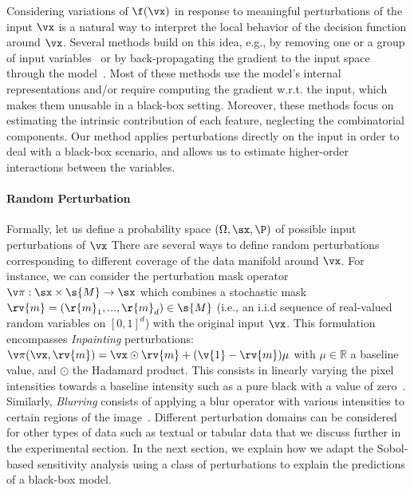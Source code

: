 Considering variations of $\f(\vx)$ in response to meaningful perturbations of the input $\vx$ is a natural way to interpret the local behavior of the decision function around $\vx$. Several methods build on this idea, e.g., by removing one or a group of input variables~\cite{zeiler2014visualizing, ribeiro2016lime, fong2017perturbation, petsiuk2018rise, fong2019extremal} or by back-propagating the gradient to the input space through the model~\cite{simonyan2014deep, sundararajan2017axiomatic, smilkov2017smoothgrad, Selvaraju_2019}. Most of these methods use the model's internal representations and/or require computing the gradient w.r.t. the input, which makes them unusable in a black-box setting. Moreover, these methods focus on estimating the intrinsic contribution of each feature, neglecting the combinatorial components. Our method applies perturbations directly on the input in order to deal with a black-box scenario, and allows us to estimate higher-order interactions between the variables.

\paragraph{Random Perturbation}
\label{sobol:sec:perturbation_masks}

Formally, let us define a probability space $(\Omega,\sx,\P)$ of possible input perturbations of $\vx$
There are several ways to define random perturbations corresponding to different coverage of the data manifold around $\vx$. For instance, we can consider the perturbation mask operator $\perturbation: \sx \times \s{M} \to \sx$ which combines a stochastic mask $\rv{m} = (\r{m}_1, ..., \r{m}_d) \in \s{M}$ (i.e., an i.i.d sequence of real-valued random variables on $[0, 1]^d$) with the original input $\vx$. This formulation encompasses \textit{Inpainting} perturbations: $\perturbation(\vx, \rv{m}) = \vx \odot \rv{m} + (\v{1} - \rv{m}) \mu$ with $\mu \in \mathbb{R}$ a baseline value, and $\odot$ the Hadamard product. This consists in linearly varying the pixel intensities towards a baseline intensity such as a pure black with a value of zero~\cite{fong2017perturbation,ribeiro2016lime,zeiler2014visualizing,petsiuk2018rise}. Similarly, \textit{Blurring} consists of applying a blur operator with various intensities to certain regions of the image~\cite{fong2017perturbation}.
Different perturbation domains can be considered for other types of data such as textual or tabular data that we discuss further in the experimental section. In the next section, we explain how we adapt the Sobol-based sensitivity analysis using a class of perturbations to explain the predictions of a black-box model.

